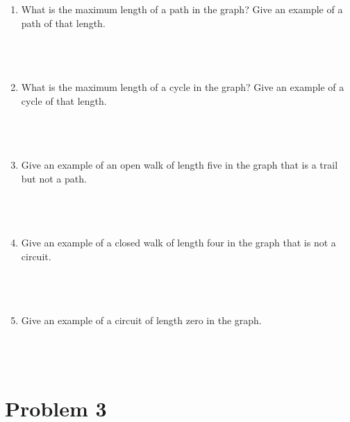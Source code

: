 \documentclass{amsart}
\theoremstyle{definition}
\theoremstyle{Exercise}
\theoremstyle{remark}
\theoremstyle{rule}
\numberwithin{equation}{section}
\begin{document}
    \begin{enumerate}[label=(\roman*)]
        \item What is the maximum length of a path in the graph? Give an example of a path of that length.\\\\
\\\\
        \item What is the maximum length of a cycle in the graph? Give an example of a cycle of that length.\\\\
\\\\
        \item Give an example of an open walk of length five in the graph that is a trail but not a path.\\\\
\\\\
        \item Give an example of a closed walk of length four in the graph that is not a circuit.\\\\
\\\\
        \item Give an example of a circuit of length zero in the graph.\\\\
\\\\
    \end{enumerate}
    \newpage
    


\section*{Problem 3}
\end{document}
